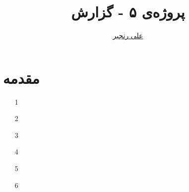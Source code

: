 \documentclass[logo=images/logo.png]{tehranReport}
\title{پروژه‌ی ۵ - گزارش}
\author{\href{mailto:ranjbar.ali@ut.ac.ir?subject=[OS\%20S99 L1]\%20}{علی رنجبر}}
\begin{document}
	\maketitlepage
	\section*{مقدمه}
	\begin{enumerate}
		\item[1]
		
		\item[2]
		
		\item[3]
		
		\item[4]
		
		\item[5]
		
		\item[6]
		
	\end{enumerate}
	
\end{document}
